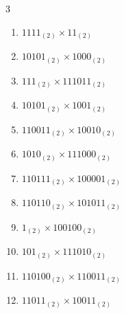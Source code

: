 \begin{multicols}{3}
\begin{enumerate}

  \item $1111_{(2)} \times 11_{(2)}$


  \item $10101_{(2)} \times 1000_{(2)}$


\columnbreak %

  \item $111_{(2)} \times 111011_{(2)}$


  \item $10101_{(2)} \times 1001_{(2)}$


  \item $110011_{(2)} \times 10010_{(2)}$


  \item $1010_{(2)} \times 111000_{(2)}$


  \item $110111_{(2)} \times 100001_{(2)}$


\columnbreak %

\resetques

  \item $110110_{(2)} \times 101011_{(2)}$


  \item $1_{(2)} \times 100100_{(2)}$


  \item $101_{(2)} \times 111010_{(2)}$


  \item $110100_{(2)} \times 110011_{(2)}$


  \item $11011_{(2)} \times 10011_{(2)}$



\end{enumerate}
\end{multicols}
